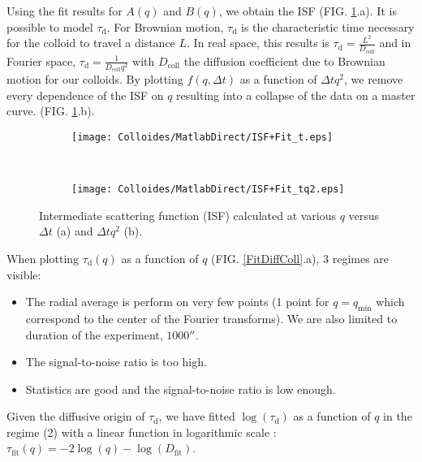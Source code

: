 \documentclass[%
 aip,
 jmp,%
 amsmath,amssymb,
reprint,%
]{revtex4-1}
\begin{document}
Using the fit results for $A(q)$ and $B(q)$, we obtain the ISF (FIG. \ref{ISF}.a). It is possible to model $\tau_\text{d}$. For Brownian motion, $\tau_\text{d}$ is the characteristic time necessary for the colloid to travel a distance $L$. In real space, this results is $\tau_\text{d} = \frac{L^2}{D_\text{coll}}$ and in Fourier space, $\tau_\text{d} = \frac{1}{D_\text{coll} q^2}$ with $D_\text{coll}$ the diffusion coefficient due to Brownian motion for our colloids. By plotting $f(q, \Delta t)$ as a function of $\Delta t q^2$, we remove every dependence of the ISF on $q$ resulting into a collapse of the data on a master curve. (FIG. \ref{ISF}.b). 

\begin{figure}[H]
	\begin{subfigure}[b]{\linewidth}
		\centering
		\texttt{[image: Colloides/MatlabDirect/ISF+Fit\_t.eps]}		
	\end{subfigure}
	\\
	\begin{subfigure}[b]{\linewidth}
		\centering
		\texttt{[image: Colloides/MatlabDirect/ISF+Fit\_tq2.eps]}
	\end{subfigure}
	\caption{Intermediate scattering function (ISF) calculated at various $q$ versus $\Delta t$ (a) and $\Delta tq^2$ (b).}
	\label{ISF}
\end{figure}

When plotting $\tau_\text{d}(q)$ as a function of $q$ (FIG. \ref{FitDiffColl}.a), 3 regimes are visible:

\begin{itemize}
\item[\textbf{(1)}] The radial average is perform on very few points (1 point for $q = q_\text{min}$ which correspond to the center of the Fourier transforms). We are also limited to duration of the experiment, $\unit{1000}{\second}$.
\item[\textbf{(3)}] The signal-to-noise ratio is too high.
\item[\textbf{(2)}] Statistics are good and the signal-to-noise ratio is low enough.
\end{itemize}


Given the diffusive origin of $\tau_\text{d}$, we have fitted $\log(\tau_\text{d})$ as a function of $q$ in the regime (2) with a linear function in logarithmic scale : $\tau_\text{fit}(q) = -2\log(q) - \log(D_\text{fit})$. 
\end{document}
